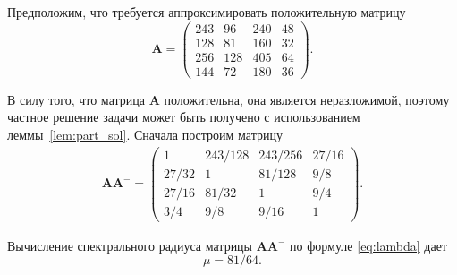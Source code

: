 \documentclass[specialist,
               substylefile = spbu.rtx,
               subf,href,colorlinks=true, 12pt]{disser}
\theoremstyle{definition}
\begin{document}
Предположим, что требуется аппроксимировать положительную матрицу 
\begin{equation*}
\bm{A}
=
\left(
\begin{array}{cccc}
243 & 96 & 240 & 48
\\
128 & 81 & 160 & 32
\\
256 & 128 & 405 & 64
\\
144 & 72 & 180 & 36
\end{array}
\right).
\end{equation*}

В силу того, что матрица $\bm{A}$ положительна, она является неразложимой, поэтому частное решение задачи может быть получено с использованием леммы~\ref{lem:part_sol}. Сначала построим матрицу
\begin{gather*}
\bm{A}\bm{A}^{-}
=
\left(
\begin{array}{cccc}
1 & 243/128 & 243/256 & 27/16
\\
27/32 & 1 & 81/128 & 9/8
\\
27/16 & 81/32 & 1 & 9/4
\\
3/4 & 9/8 & 9/16 & 1
\end{array}
\right).
\end{gather*}

Вычисление спектрального радиуса матрицы $\bm{A}\bm{A}^{-}$ по формуле \eqref{eq:lambda} дает 
$$
\mu
=
81/64.
$$
\end{document}
